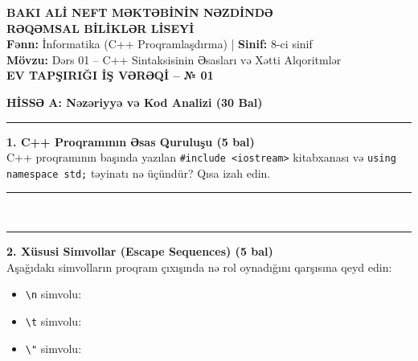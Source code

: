 \documentclass[10.5pt,a4paper]{article}
\begin{document}
\begin{center}
    {\large \textbf{BAKI ALİ NEFT MƏKTƏBİNİN NƏZDİNDƏ}}\\[0.1cm]
    {\LARGE \textbf{RƏQƏMSAL BİLİKLƏR LİSEYİ}}\\[0.2cm]
    {\textbf{Fənn:} İnformatika (C++ Proqramlaşdırma) \quad | \quad \textbf{Sinif:} 8-ci sinif}\\[0.05cm]
    {\textbf{Mövzu:} Dərs 01 -- C++ Sintaksisinin Əsasları və Xətti Alqoritmlər}\\[0.15cm]
    {\Large \textbf{EV TAPŞIRIĞI İŞ VƏRƏQİ -- № 01}}
\end{center}

\vspace{0.05cm}
\noindent{}

\vspace{0.2cm}
{\large \textbf{HİSSƏ A: Nəzəriyyə və Kod Analizi (30 Bal)}}
\vspace{0.05cm}
\hrule
\vspace{0.15cm}

\textbf{1. C++ Proqramının Əsas Quruluşu (5 bal)}\\
C++ proqramının başında yazılan \texttt{\#include <iostream>} kitabxanası və \texttt{using namespace std;} təyinatı nə üçündür? Qısa izah edin.\\
\noindent\rule{\textwidth}{0.4pt}\\[0.15cm]
\noindent\rule{\textwidth}{0.4pt}

\vspace{0.2cm}
\textbf{2. Xüsusi Simvollar (Escape Sequences) (5 bal)}\\
Aşağıdakı simvolların proqram çıxışında nə rol oynadığını qarşısına qeyd edin:
\begin{itemize}
    \item \texttt{\textbackslash n} simvolu: \hrulefill
    \item \texttt{\textbackslash t} simvolu: \hrulefill
    \item \texttt{\textbackslash "} simvolu: \hrulefill
\end{itemize}
\end{document}
